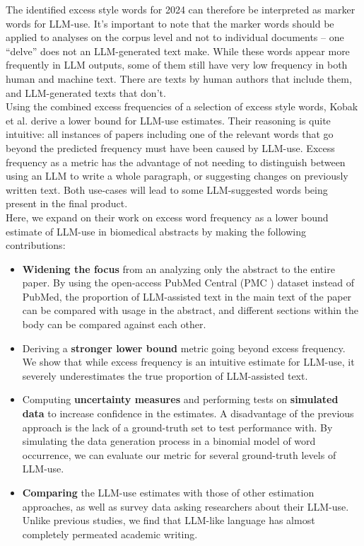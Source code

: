 The identified excess style words for 2024 can therefore be interpreted as marker words for LLM-use.
It's important to note that the marker words should be applied to analyses on the corpus level and not to individual documents -- one ``delve'' does not an LLM-generated text make. 
While these words appear more frequently in LLM outputs, some of them still have very low frequency in both human and machine text.
There are texts by human authors that include them, and LLM-generated texts that don't.
\\
Using the combined excess frequencies of a selection of excess style words, Kobak et al. derive a lower bound for LLM-use estimates.
Their reasoning is quite intuitive: all instances of papers including one of the relevant words that go beyond the predicted frequency must have been caused by LLM-use.
Excess frequency as a metric has the advantage of not needing to distinguish between using an LLM to write a whole paragraph, or suggesting changes on previously written text.
Both use-cases will lead to some LLM-suggested words being present in the final product.
\\
Here, we expand on their work on excess word frequency as a lower bound estimate of LLM-use in biomedical abstracts by making the following contributions:
\begin{itemize}
    \item \textbf{Widening the focus} from an analyzing only the abstract to the entire paper. By using the open-access PubMed Central (PMC \cite{pmc}) dataset  instead of PubMed, the proportion of LLM-assisted text in the main text of the paper can be compared with usage in the abstract, and different sections within the body can be compared against each other. 
    \item Deriving a \textbf{stronger lower bound} metric going beyond excess frequency. We show that while excess frequency is an intuitive estimate for LLM-use, it severely underestimates the true proportion of LLM-assisted text. 
    \item Computing \textbf{uncertainty measures} and performing tests on \textbf{simulated data} to increase confidence in the estimates. A disadvantage of the previous approach is the lack of a ground-truth set to test performance with. By simulating the data generation process in a binomial model of word occurrence, we can evaluate our metric for several ground-truth levels of LLM-use.
    \item \textbf{Comparing} the LLM-use estimates with those of other estimation approaches, as well as survey data asking researchers about their LLM-use. Unlike previous studies, we find that LLM-like language has almost completely permeated academic writing.
\end{itemize}
